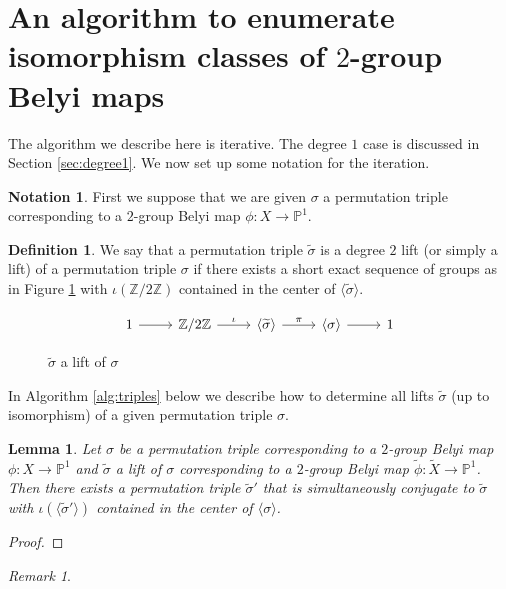 \documentclass{dcthesis}
\newcommand{\PP}{\mathbb P}
\newcommand{\ZZ}{\mathbb Z}
\newcommand{\defi}[1]{\textsf{#1}}
\newcommand{\wt}[1]{\widetilde{#1}}
\newtheorem{lemma}[prop]{Lemma}
\theoremstyle{definition}
\newtheorem{definition}[prop]{Definition}
\newtheorem{notation}[prop]{Notation}
\theoremstyle{remark}
\newtheorem{remark}[prop]{Remark}
\numberwithin{equation}{section}
\numberwithin{figure}{section}
\begin{document}
{  \section{An algorithm to enumerate isomorphism classes of $2$-group Belyi maps}{\label{sec:isoclasses}
    The algorithm we describe here is iterative.
    The degree $1$ case is discussed in Section \ref{sec:degree1}.
    We now set up some notation for the iteration.
    \begin{notation}\label{not:triples}
      First we suppose that we are given
      $\sigma$ a permutation triple corresponding
      to a $2$-group Belyi map $\phi:X\to\PP^1$.
      \begin{definition}
        \label{def:lift}
        We say that a permutation triple $\wt{\sigma}$
        is a \defi{degree $2$ lift} (or simply a \defi{lift})
        of a permutation triple $\sigma$ if
        there exists a short exact sequence of groups
        as in Figure \ref{fig:lifttriple}
        with $\iota(\ZZ/2\ZZ)$ contained in the center of
        $\langle\wt{\sigma}\rangle$.
      \end{definition}
      \begin{figure}[ht]\label{fig:lifttriple}
        \[
          \begin{tikzcd}[ampersand replacement=\&, row sep = small]
            1\arrow{r}\&\ZZ/2\ZZ\arrow{r}{\iota}\&\langle\widetilde{\sigma}\rangle\arrow{r}{\pi}\&\langle\sigma\rangle\arrow{r}\&1
          \end{tikzcd}
        \]
        \caption{$\wt{\sigma}$ a lift of $\sigma$}
      \end{figure}
      In Algorithm \ref{alg:triples} below
      we describe how to determine all lifts $\wt{\sigma}$ (up to isomorphism)
      of a given permutation triple $\sigma$.
      \begin{lemma}
        \label{lem:central}
        Let $\sigma$ be a permutation triple corresponding to a $2$-group Belyi map
        $\phi:X\to\PP^1$ and $\wt{\sigma}$ a lift of $\sigma$
        corresponding to a $2$-group Belyi map $\wt{\phi}:\wt{X}\to\PP^1$.
        Then there exists a permutation triple $\wt{\sigma}'$
        that is simultaneously conjugate to $\wt{\sigma}$ with
        $\iota(\langle\wt{\sigma}'\rangle)$ contained in the center of
        $\langle\sigma\rangle$.
      \end{lemma}
      \begin{proof}
      \end{proof}
      \begin{remark}

\end{remark}
\end{notation}}}
\end{document}
